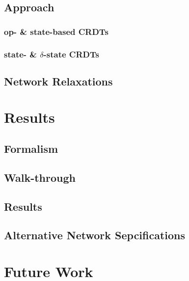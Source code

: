 \documentclass{thesis}
\begin{document}
  \section{Approach}
  \subsection{op- \& state-based CRDTs}
  \subsection{state- \& $\delta$-state CRDTs}
  \section{Network Relaxations}

  \chapter{Results}
  \section{Formalism}
  \section{Walk-through}
  \section{Results}
  \section{Alternative Network Sepcifications}

  \chapter{Future Work}

  \newpage
  
\end{document}
